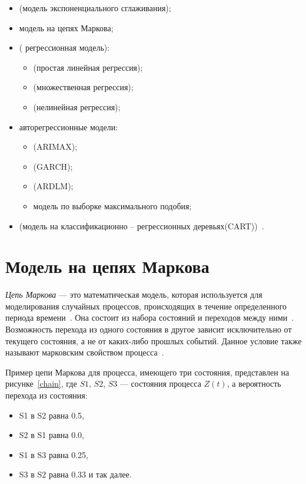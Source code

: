 \begin{itemize}
\item (модель экспоненциального сглаживания);
\item модель на цепях Маркова;
\item( регрессионная модель):
    \begin{itemize}
        \item (простая линейная регрессия);
        \item (множественная регрессия);
        \item (нелинейная регрессия);
    \end{itemize}
\item авторегрессионные модели:
\begin{itemize}
    \item (ARIMAX);
    \item (GARCH);
    \item (ARDLM);
    \item модель по выборке максимального подобия;
\end{itemize}
\item (модель на классификационно -- регрессионных деревьях(CART))~\cite{myref9}.
\end{itemize}


\section{Модель на цепях Маркова}

\textit{Цепь Маркова} --- это математическая модель, которая используется для моделирования случайных процессов,
происходящих в течение определенного периода времени~\cite{myref8, myref9, myref13, myref16}.
Она состоит из набора состояний и переходов между ними~\cite{myref16, myref9}.
Возможность перехода из одного состояния в другое зависит исключительно от текущего состояния, а не от каких-либо прошлых событий.
Данное условие также называют марковским свойством процесса~\cite{myref8, myref9,myref13, myref16}.

Пример цепи Маркова для процесса, имеющего три состояния, представлен на рисунке~\ref{chain}, где $S1$, $S2$, $S3$ — состояния процесса $Z(t)$,
а вероятность перехода из состояния:
\begin{itemize}
    \item S1 в S2 равна 0.5,
    \item S2 в S1 равна 0.0,
    \item S1 в S3 равна 0.25,
    \item S3 в S2 равна 0.33 и так далее.
\end{itemize}

